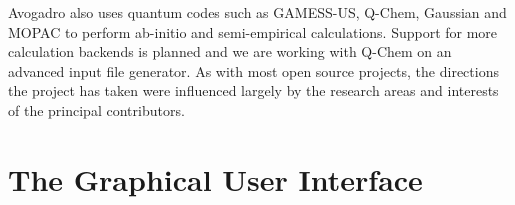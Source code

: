 \documentclass{article}
\begin{document}
Avogadro also uses quantum codes such as GAMESS-US, Q-Chem, Gaussian and MOPAC to perform ab-initio and semi-empirical calculations. Support for more calculation backends is planned and we are working with Q-Chem on an advanced input file generator. As with most open source projects, the directions the project has taken were influenced largely by the research areas and interests of the principal contributors.

\section{The Graphical User Interface}


\end{document}
